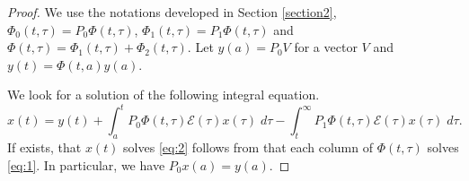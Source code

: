 \documentclass[a4paper,11pt]{article}
\newcommand{\E}{\mathcal{E}}
\theoremstyle{remark}
\begin{document}
\begin{proof}
We use the notations developed in Section \ref{section2}, $\Phi_0(t,\tau) = P_0\Phi(t,\tau)$, $\Phi_1(t,\tau) = P_1\Phi(t,\tau)$ and $\Phi(t,\tau) = \Phi_1(t,\tau) + \Phi_2(t,\tau)$. Let $y(a) = P_0 V$ for a vector $V$ and $y(t) = \Phi(t,a)y(a)$.

 
We look for a solution of the following integral equation.
 \begin{equation*} \label{eq:integral}
 x(t) = y(t) + \int_a^t P_0\Phi(t,\tau)\E(\tau)x(\tau) \;d\tau  - \int_t^\infty P_1\Phi(t,\tau)\E(\tau)x(\tau) \; d\tau.
 \end{equation*}
 If exists, that $x(t)$ solves \eqref{eq:2} follows from that each column of $\Phi(t,\tau)$ solves \eqref{eq:1}. In particular, we have $P_0x(a) = y(a)$.
 

\end{proof}
\end{document}
